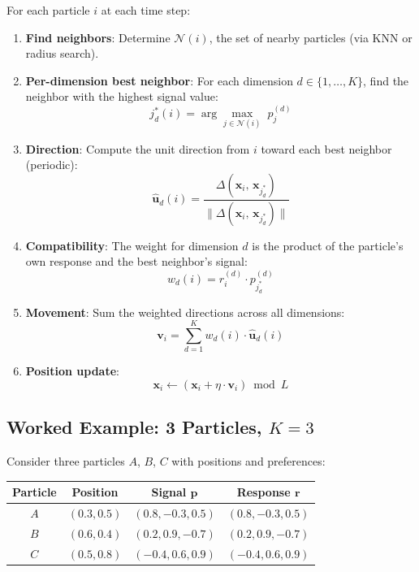 \documentclass[11pt,a4paper]{article}
\begin{document}
For each particle $i$ at each time step:

\begin{enumerate}[nosep]
\item \textbf{Find neighbors}: Determine $\mathcal{N}(i)$, the set of nearby particles (via KNN or radius search).

\item \textbf{Per-dimension best neighbor}: For each dimension $d \in \{1, \ldots, K\}$, find the neighbor with the highest signal value:
\begin{equation}
j^*_d(i) = \arg\max_{j \in \mathcal{N}(i)} \; p_j^{(d)}
\end{equation}

\item \textbf{Direction}: Compute the unit direction from $i$ toward each best neighbor (periodic):
\begin{equation}
\hat{\mathbf{u}}_d(i) = \frac{\Delta(\mathbf{x}_i,\, \mathbf{x}_{j^*_d})}{\|\Delta(\mathbf{x}_i,\, \mathbf{x}_{j^*_d})\|}
\end{equation}

\item \textbf{Compatibility}: The weight for dimension $d$ is the product of the particle's own response and the best neighbor's signal:
\begin{equation}
w_d(i) = r_i^{(d)} \cdot p_{j^*_d}^{(d)}
\end{equation}

\item \textbf{Movement}: Sum the weighted directions across all dimensions:
\begin{equation}
\mathbf{v}_i = \sum_{d=1}^{K} w_d(i) \cdot \hat{\mathbf{u}}_d(i)
\end{equation}

\item \textbf{Position update}:
\begin{equation}
\mathbf{x}_i \leftarrow \left(\mathbf{x}_i + \eta \cdot \mathbf{v}_i\right) \bmod L
\end{equation}
\end{enumerate}

\subsection{Worked Example: 3 Particles, $K = 3$}

Consider three particles $A$, $B$, $C$ with positions and preferences:

\begin{center}
\begin{tabular}{cccc}
\toprule
Particle & Position & Signal $\mathbf{p}$ & Response $\mathbf{r}$ \\
\midrule
$A$ & $(0.3, 0.5)$ & $(0.8, -0.3, 0.5)$ & $(0.8, -0.3, 0.5)$ \\
$B$ & $(0.6, 0.4)$ & $(0.2, 0.9, -0.7)$ & $(0.2, 0.9, -0.7)$ \\
$C$ & $(0.5, 0.8)$ & $(-0.4, 0.6, 0.9)$ & $(-0.4, 0.6, 0.9)$ \\
\bottomrule
\end{tabular}
\end{center}
\end{document}

